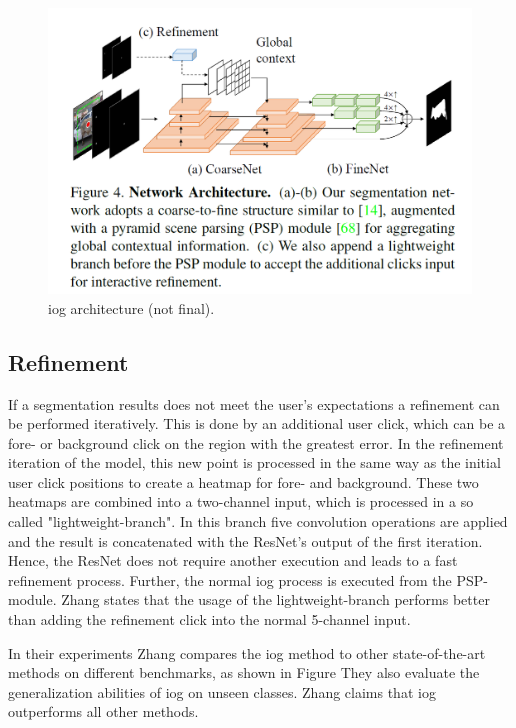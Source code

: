 \begin{figure}
	\includegraphics[width=\linewidth]{figures/chap31_arch.png}
	\caption[IOG Architecture]{\gls{iog} architecture (not final).}
	\label{fig:ch3:sec1:arch}
\end{figure}

\subsection{Refinement}\label{ord:ch3:sec4:subsec3}
If a segmentation results does not meet the user's expectations a refinement can be performed iteratively. 
This is done by an additional user click, which can be a fore- or background click on the region with the greatest error. 
In the refinement iteration of the model, this new point is processed in the same way as the initial user click positions to create a heatmap for fore- and background.
These two heatmaps are combined into a two-channel input, which is processed in a so called "lightweight-branch". 
In this branch five convolution operations are applied and the result is concatenated with the ResNet's output of the first iteration.
Hence, the ResNet does not require another execution and leads to a fast refinement process.
Further, the normal \gls{iog} process is executed from the PSP-module. 
Zhang states that the usage of the lightweight-branch performs better than adding the refinement click into the normal 5-channel input.

In their experiments Zhang compares the \gls{iog} method to other state-of-the-art methods on different benchmarks, as shown in Figure %
They also evaluate the generalization abilities of \gls{iog} on unseen classes.
Zhang claims that \gls{iog} outperforms all other methods.

